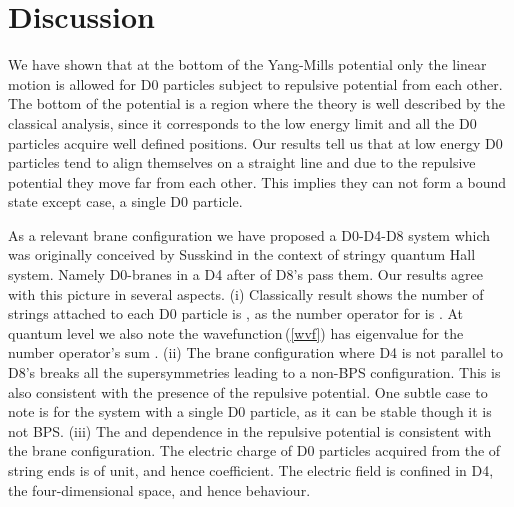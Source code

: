\documentclass[a4paper,12pt]{article}
\begin{document}
\section{Discussion}
We have shown  that at the bottom of the Yang-Mills potential only the linear motion is allowed for D0 particles
subject to \coordHE{} repulsive potential from each other. The bottom of the potential is a
region where the theory is well described by the classical analysis, since it corresponds to the low energy limit
and all the D0 particles acquire well defined positions. Our results tell us  that at low energy D0 particles tend
to align themselves on a straight line and due to the repulsive potential they move far from each other. This
implies they can not form a bound state except \coordHE{} case, a single D0 particle. \newline



As a relevant brane configuration we have  proposed a D0-D4-D8 system which was originally conceived by Susskind
in the context of stringy quantum Hall system. Namely D0-branes in a D4 after \myHighlight{$\kappa$}\coordHE{} of D8's  pass them.  Our
results agree with this picture in several aspects. \newline (i) Classically  \coordHE{} result
shows the number of strings attached to each D0 particle is \myHighlight{$\kappa$}\coordHE{}, as the  number operator for \coordHE{} is
\coordHE{}. At quantum level we also note  the wavefunction\,(\ref{wvf}) has eigenvalue \coordHE{} for the number operator's sum \coordHE{}. (ii) The  brane configuration where D4 is
not parallel to D8's  breaks all the supersymmetries leading to a non-BPS configuration. This is also consistent
with the presence of the repulsive potential. One subtle case to note is  for the system with a  single D0
particle, as it can be   stable  though it is not BPS. (iii) The \myHighlight{$\kappa$}\coordHE{} and \coordHE{} dependence in the repulsive
potential is consistent with the  brane configuration.  The electric charge of D0 particles  acquired from the
\myHighlight{$\kappa$}\coordHE{} of string ends is of  \myHighlight{$\kappa$}\coordHE{} unit, and hence \coordHE{} coefficient.  The electric field is confined
in D4, the four-dimensional space, and hence \coordHE{} behaviour.\newline
\end{document}
